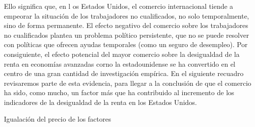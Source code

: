 \documentclass[10pt,a4paper]{article}
\begin{document}
Ello significa que, en l os Estados Unidos, el comercio internacional tiende a empeorar la situación de los trabajadores no cualificados, no solo temporalmente, sino de forma permanente. El efecto negativo del comercio sobre los trabajadores no cualificados plantea un problema político persistente, que no se puede resolver con políticas que ofrecen ayudas temporales (como un seguro de desempleo). Por consiguiente, el efecto potencial del mayor comercio sobre la desigualdad de la renta en economías avanzadas corno la estadounidense se ha convertido en el centro de una gran cantidad de investigación empírica. En el siguiente recuadro revisaremos parte de esta evidencia, para llegar a la conclusión de que el comercio ha sido, como mucho, un factor más que ha contribuido al incremento de los indicadores de la desigualdad de la renta en los Estados Unidos.


Igualación del precio de los factores 
\end{document}
